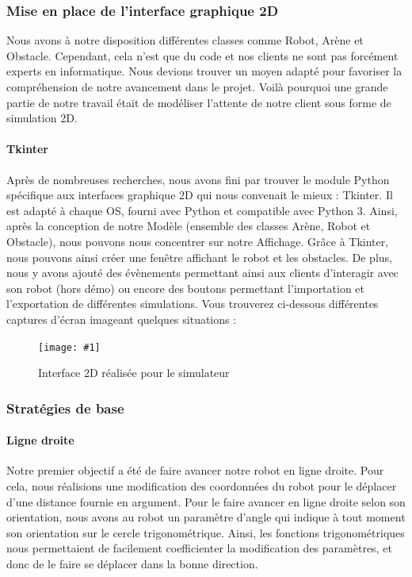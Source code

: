 \documentclass[12pt]{article}
\newcommand\img[2]{
\begin{figure}[!h]
  \centering
    \texttt{[image: \#1]}
  \caption{#2}
  \label{img:#1}
\end{figure}
}
\begin{document}
\subsubsection{Mise en place de l'interface graphique 2D}
Nous avons à notre disposition différentes classes comme Robot, Arène et Obstacle. Cependant,  cela n’est que du code et nos clients ne sont pas forcément experts en informatique. Nous devions trouver un moyen adapté pour favoriser la compréhension de notre avancement dans le projet. Voilà pourquoi une grande partie de notre travail était de modéliser l’attente de notre client sous forme de simulation 2D.

\paragraph{Tkinter\\}
Après de nombreuses recherches, nous avons fini par trouver le module Python spécifique aux interfaces graphique 2D qui nous convenait le mieux : Tkinter. Il est adapté à chaque OS, fourni avec Python et compatible avec Python 3. Ainsi, après la conception de notre Modèle (ensemble des classes Arène, Robot et Obstacle), nous pouvons nous concentrer sur notre Affichage.
Grâce à Tkinter, nous pouvons ainsi créer une fenêtre affichant le robot et les obstacles. De plus, nous y avons ajouté des évènements permettant ainsi aux clients d’interagir avec son robot (hors démo) ou encore des boutons permettant l’importation et l’exportation de différentes simulations.
Vous trouverez ci-dessous différentes captures d’écran imageant quelques situations :

\img{Images/interface2D.png}{Interface 2D réalisée pour le simulateur}

\subsubsection{Stratégies de base}
\paragraph{Ligne droite\\}
Notre premier objectif a été de faire avancer notre robot en ligne droite. Pour cela, nous réalisions une modification des coordonnées du robot pour le déplacer d'une distance fournie en argument. Pour le faire avancer en ligne droite selon son orientation, nous avons au robot un paramètre d'angle qui indique à tout moment son orientation sur le cercle trigonométrique. Ainsi, les fonctions trigonométriques nous permettaient de facilement coefficienter la modification des paramètres, et donc de le faire se déplacer dans la bonne direction.
\end{document}
